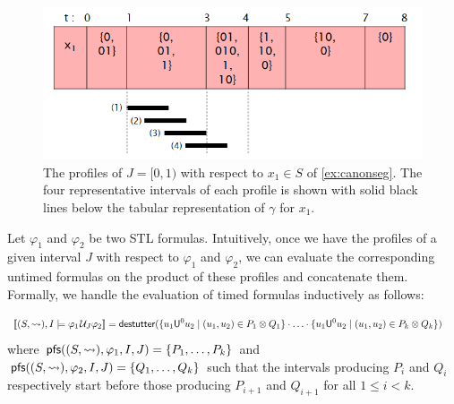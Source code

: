 \begin{figure} 
	\centering
	\includegraphics[scale=0.45]{profiles.png}
	\caption{The profiles of $J = [0,1)$ with respect to $x_1 \in S$ of \cref{ex:canonseg}. The four representative intervals of each profile is shown with solid black lines below the tabular representation of $\gamma$ for $x_1$.}
	\label{fig:profiles}
\end{figure}

Let $\varphi_1$ and $\varphi_2$ be two STL formulas.
Intuitively, once we have the profiles of a given interval $J$ with respect to $\varphi_1$ and $\varphi_2$, we can evaluate the corresponding untimed formulas on the product of these profiles and concatenate them.
Formally, we handle the evaluation of timed formulas inductively as follows:

\scriptsize
\begin{align*}
	\llbracket (S, {\hb}), I \models \varphi_1 \until_J \varphi_2 \rrbracket &= \destutter( \{ u_1 \mathsf{U}^0 u_2 \st (u_1, u_2) \in P_1 \otimes Q_1 \} \cdot \ldots \cdot \{ u_1 \mathsf{U}^0 u_2 \st (u_1, u_2) \in P_k \otimes Q_k \} )
\end{align*}
\normalsize
where $\mathsf{pfs}((S,{\rightsquigarrow}), \varphi_1, I, J) = \{P_1, \ldots, P_k \}$ and $\mathsf{pfs}((S,{\rightsquigarrow}), \varphi_2, I, J) = \{Q_1, \ldots, Q_k \}$ such that the intervals producing $P_i$ and $Q_i$ respectively start before those producing $P_{i+1}$ and $Q_{i+1}$ for all $1 \leq i < k$.



